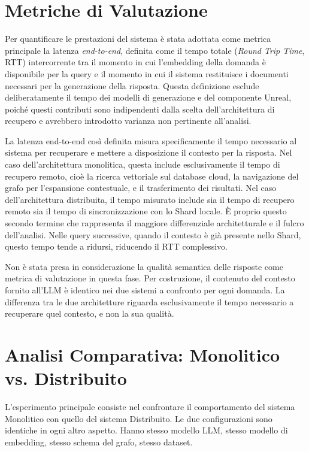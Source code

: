 \section{Metriche di Valutazione}

Per quantificare le prestazioni del sistema è stata adottata come metrica principale la latenza \textit{end-to-end}, definita come il tempo totale (\textit{Round Trip Time}, RTT) intercorrente tra il momento in cui l'embedding della domanda è disponibile per la query e il momento in cui il sistema restituisce i documenti necessari per la generazione della risposta. Questa definizione esclude deliberatamente il tempo dei modelli di generazione e del componente Unreal, poiché questi contributi sono indipendenti dalla scelta dell'architettura di recupero e avrebbero introdotto varianza non pertinente all'analisi.

La latenza end-to-end così definita misura specificamente il tempo necessario al sistema per recuperare e mettere a disposizione il contesto per la risposta. Nel caso dell'architettura monolitica, questa include esclusivamente il tempo di recupero remoto, cioè la ricerca vettoriale sul database cloud, la navigazione del grafo per l'espansione contestuale, e il trasferimento dei risultati. Nel caso dell'architettura distribuita, il tempo misurato include sia il tempo di recupero remoto sia il tempo di sincronizzazione con lo Shard locale. È proprio questo secondo termine che rappresenta il maggiore differenziale architetturale e il fulcro dell'analisi. Nelle query successive, quando il contesto è già presente nello Shard, questo tempo tende a ridursi, riducendo il RTT complessivo.

Non è stata presa in considerazione la qualità semantica delle risposte come metrica di valutazione in questa fase. Per costruzione, il contenuto del contesto fornito all'LLM è identico nei due sistemi a confronto per ogni domanda. La differenza tra le due architetture riguarda esclusivamente il tempo necessario a recuperare quel contesto, e non la sua qualità.

\section{Analisi Comparativa: Monolitico vs. Distribuito}

L'esperimento principale consiste nel confrontare il comportamento del sistema Monolitico con quello del sistema Distribuito. Le due configurazioni sono identiche in ogni altro aspetto. Hanno stesso modello LLM, stesso modello di embedding, stesso schema del grafo, stesso dataset.

